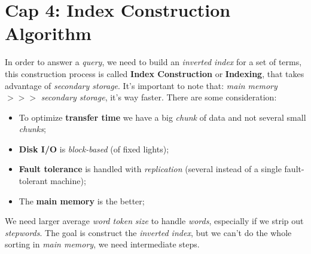 \documentclass{article}
\begin{document}
\section{Cap 4: Index Construction Algorithm}
In order to answer a \emph{query}, we need to build an \emph{inverted index} for a set of terms, this construction process is called \textbf{Index Construction} or \textbf{Indexing}, that takes advantage of \emph{secondary storage}. It's important to note that:\emph{ main memory} $>>>$ \emph{secondary storage}, it's way faster. There are some consideration:
\begin{itemize}
\item To optimize \textbf{transfer time} we have a big \emph{chunk} of data and not several small \emph{chunks};
\item \textbf{Disk I/O} is \emph{block-based} (of fixed lights);
\item \textbf{Fault tolerance} is handled with \emph{replication} (several instead of a single fault-tolerant machine);
\item The \textbf{main memory} is the better;
\end{itemize}
We need larger average \emph{word token} \emph{size} to handle \emph{words}, especially if we strip out \emph{stepwords}. The goal is construct the \emph{inverted index}, but we can't do the whole sorting in \emph{main memory}, we need intermediate steps. 
\end{document}
